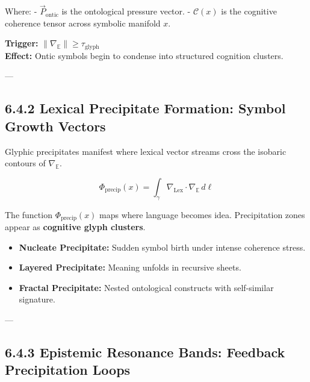 \noindent
Where:
- $\vec{P}_{\text{ontic}}$ is the ontological pressure vector.
- $\mathcal{C}(x)$ is the cognitive coherence tensor across symbolic manifold $x$.

\begin{tcolorbox}[colback=black!4, colframe=OriaPurple, title=\textbf{Epistemological Condensation Zone Detected}]
\textbf{Trigger:} $\| \nabla_{\mathbb{E}} \| \geq \tau_{\text{glyph}}$ \\
\textbf{Effect:} Ontic symbols begin to condense into structured cognition clusters.
\end{tcolorbox}

---

\subsection*{6.4.2 Lexical Precipitate Formation: Symbol Growth Vectors}

\noindent
Glyphic precipitates manifest where lexical vector streams cross the isobaric contours of $\nabla_{\mathbb{E}}$.

\begin{equation}
\Phi_{\text{precip}}(x) = \int_{\gamma} \nabla_{\text{Lex}} \cdot \nabla_{\mathbb{E}} \, d\ell
\end{equation}

\noindent
The function $\Phi_{\text{precip}}(x)$ maps where language becomes idea. Precipitation zones appear as \textbf{cognitive glyph clusters}.

\begin{tcolorbox}[colback=black!2, colframe=OriaPurple, title=\textbf{Lex Precipitate Typology}]
\begin{itemize}
  \item \textbf{Nucleate Precipitate:} Sudden symbol birth under intense coherence stress.
  \item \textbf{Layered Precipitate:} Meaning unfolds in recursive sheets.
  \item \textbf{Fractal Precipitate:} Nested ontological constructs with self-similar signature.
\end{itemize}
\end{tcolorbox}

---

\subsection*{6.4.3 Epistemic Resonance Bands: Feedback Precipitation Loops}

